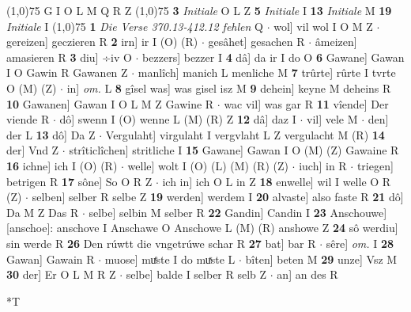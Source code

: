 \documentclass[8pt,a4paper,notitlepage]{article}
\begin{document}
\begin{table}[ht]
\begin{minipage}[t]{0.5\linewidth}
\scriptsize
\line(1,0){75} \newline
G I O L M Q R Z \newline
\line(1,0){75} \newline
\textbf{3} \textit{Initiale} O L Z  \textbf{5} \textit{Initiale} I  \textbf{13} \textit{Initiale} M  \textbf{19} \textit{Initiale} I  \newline
\line(1,0){75} \newline
\textbf{1} \textit{Die Verse 370.13-412.12 fehlen} Q   $\cdot$ wol] vil wol I O M Z  $\cdot$ gereizen] geczieren R \textbf{2} irn] ir I (O) (R)  $\cdot$ gesâhet] gesachen R  $\cdot$ âmeizen] amasieren R \textbf{3} diu] ÷iv O  $\cdot$ bezzers] bezzer I \textbf{4} dâ] da ir I do O \textbf{6} Gawane] Gawan I O Gawin R Gawanen Z  $\cdot$ manlîch] manich L menliche M \textbf{7} trûrte] rûrte I tvrte O (M) (Z)  $\cdot$ in] \textit{om.} L \textbf{8} gîsel was] was gisel isz M \textbf{9} dehein] keyne M deheins R \textbf{10} Gawanen] Gawan I O L M Z Gawine R  $\cdot$ wac vil] was gar R \textbf{11} vîende] Der viende R  $\cdot$ dô] swenn I (O) wenne L (M) (R) Z \textbf{12} dâ] daz I  $\cdot$ vil] vele M  $\cdot$ den] der L \textbf{13} dô] Da Z  $\cdot$ Vergulaht] virgulaht I vergvlaht L Z vergulacht M (R) \textbf{14} der] Vnd Z  $\cdot$ strîticlîchen] stritliche I \textbf{15} Gawane] Gawan I O (M) (Z) Gawaine R \textbf{16} ichne] ich I (O) (R)  $\cdot$ welle] wolt I (O) (L) (M) (R) (Z)  $\cdot$ iuch] in R  $\cdot$ triegen] betrigen R \textbf{17} sône] So O R Z  $\cdot$ ich in] ich O L in Z \textbf{18} enwelle] wil I welle O R (Z)  $\cdot$ selben] selber R selbe Z \textbf{19} werden] werdem I \textbf{20} alvaste] also faste R \textbf{21} dô] Da M Z Das R  $\cdot$ selbe] selbin M selber R \textbf{22} Gandin] Candin I \textbf{23} Anschouwe] [anschoe]: anschove I Anschawe O Anschowe L (M) (R) anshowe Z \textbf{24} sô werdiu] sin werde R \textbf{26} Den rúwtt die vngetrúwe schar R \textbf{27} bat] bar R  $\cdot$ sêre] \textit{om.} I \textbf{28} Gawan] Gawain R  $\cdot$ muose] muͤste I do muͯste L  $\cdot$ bîten] beten M \textbf{29} unze] Vsz M \textbf{30} der] Er O L M R Z  $\cdot$ selbe] balde I selber R selb Z  $\cdot$ an] an des R \newline
\end{minipage}
\hspace{0.5cm}
\begin{minipage}[t]{0.5\linewidth}
\small
\begin{center}*T
\end{center}
\begin{tabular}{rl}

\end{tabular}
\end{minipage}
\end{table}
\end{document}
